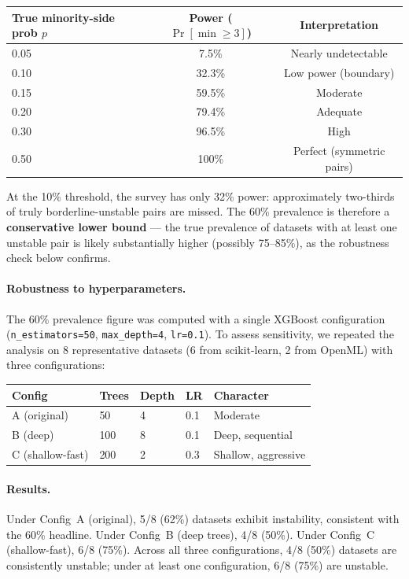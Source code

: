 \documentclass{article}
\begin{document}
\begin{center}
\small
\begin{tabular}{@{}lcc@{}}
\toprule
True minority-side prob $p$ & Power ($\Pr[\min \geq 3]$) & Interpretation \\
\midrule
0.05 & 7.5\% & Nearly undetectable \\
0.10 & 32.3\% & Low power (boundary) \\
0.15 & 59.5\% & Moderate \\
0.20 & 79.4\% & Adequate \\
0.30 & 96.5\% & High \\
0.50 & 100\% & Perfect (symmetric pairs) \\
\bottomrule
\end{tabular}
\end{center}

At the 10\% threshold, the survey has only 32\% power: approximately
two-thirds of truly borderline-unstable pairs are missed.
The 60\% prevalence is therefore a \textbf{conservative lower bound}
--- the true prevalence of datasets with at least one unstable pair is
likely substantially higher (possibly 75--85\%), as the robustness check
below confirms.

\paragraph{Robustness to hyperparameters.}
The 60\% prevalence figure was computed with a single XGBoost
configuration (\texttt{n\_estimators=50}, \texttt{max\_depth=4},
\texttt{lr=0.1}). To assess sensitivity, we repeated the analysis
on 8 representative datasets (6 from scikit-learn, 2 from OpenML)
with three configurations:

\begin{center}
\small
\begin{tabular}{@{}lllll@{}}
\toprule
Config & Trees & Depth & LR & Character \\
\midrule
A (original) & 50 & 4 & 0.1 & Moderate \\
B (deep) & 100 & 8 & 0.1 & Deep, sequential \\
C (shallow-fast) & 200 & 2 & 0.3 & Shallow, aggressive \\
\bottomrule
\end{tabular}
\end{center}

\paragraph{Results.}
Under Config~A (original), 5/8 (62\%) datasets exhibit instability,
consistent with the 60\% headline. Under Config~B (deep trees),
4/8 (50\%). Under Config~C (shallow-fast), 6/8 (75\%).
Across all three configurations, 4/8 (50\%) datasets are consistently
unstable; under at least one configuration, 6/8 (75\%) are unstable.
\end{document}
